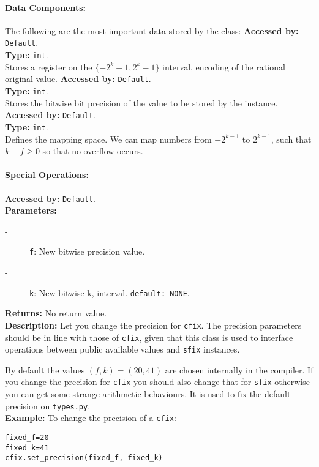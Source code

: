 	\paragraph{Data Components:}
	The following are the most important data stored by the class:
	\textbf{Accessed by:} \verb|Default|.\\
	\textbf{Type:} \verb|int|.\\
	Stores a register on the $\{-2^k-1, 2^k-1\}$ interval, encoding of the rational original value.
	\textbf{Accessed by:} \verb|Default|.\\
	\textbf{Type:} \verb|int|.\\
	Stores the bitwise bit precision of the value to be stored by the instance.
	\textbf{Accessed by:} \verb|Default|.\\
	\textbf{Type:} \verb|int|.\\
	Defines the mapping space. We can map numbers  from $-2^{k-1}$ to $2^{k-1}$, such that $k-f \geq 0$ so that no overflow occurs.
	
	
	\paragraph {Special Operations:}

			\textbf{Accessed by:} \verb|Default|.\\
    		\textbf{Parameters:}
     		\begin{description}
	     		\item[-] \verb|f|: New bitwise precision value.
	    		\item[-] \verb|k|: New bitwise k, interval. \verb|default: NONE|.
    		\end{description}
    		\textbf{Returns:} No return value. \\
     		\textbf{Description:}
				Let you change the precision for \verb|cfix|. The precision parameters should be in line with those of \verb|cfix|, given that this class is used to interface operations between public available values and \verb|sfix| instances.
        
                                By default the values $(f,k)=(20,41)$ are chosen internally in the compiler.
                                If you change the precision for \verb|cfix| you should also change that for
                                \verb|sfix| otherwise you can get some strange arithmetic behaviours.
                                It is used to fix the default precision on \verb|types.py|. \\
			\textbf{Example:}
				To change the precision of a \verb|cfix|:
\begin{lstlisting}
fixed_f=20
fixed_k=41
cfix.set_precision(fixed_f, fixed_k)
\end{lstlisting}
     			

